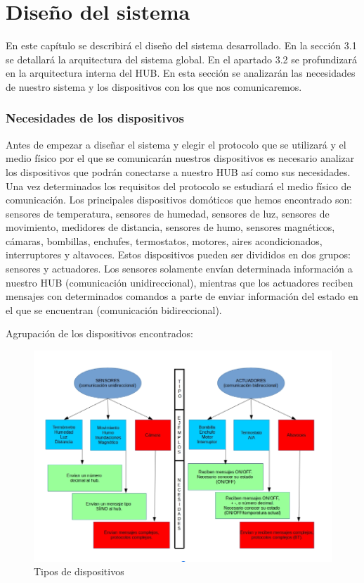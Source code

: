 \chapter{Diseño del sistema}
\label{chap:disenosistema}
En este capítulo se describirá el diseño del sistema desarrollado. 
En la sección 3.1 se detallará la arquitectura del sistema global. 
En el apartado 3.2 se profundizará en la arquitectura interna del HUB.
En esta sección se analizarán las necesidades de nuestro sistema y los dispositivos con los que nos comunicaremos.
\subsection{Necesidades de los dispositivos}
Antes de empezar a diseñar el sistema y elegir el protocolo que se utilizará y el medio físico por el que se comunicarán 
nuestros dispositivos es necesario analizar los dispositivos que podrán conectarse a nuestro HUB así como sus necesidades. 
Una vez determinados los requisitos del protocolo se estudiará el medio físico de comunicación.
\newline
\newline
Los principales dispositivos domóticos que hemos encontrado son: sensores de temperatura, sensores de humedad, 
sensores de luz, sensores de movimiento, medidores de distancia, sensores de humo, sensores magnéticos, cámaras, 
bombillas, enchufes, termostatos, motores, aires acondicionados, interruptores y altavoces.
\newline
Estos dispositivos pueden ser divididos en dos grupos: sensores y actuadores. 
\newline
Los sensores solamente envían determinada información a nuestro HUB (comunicación unidireccional), 
mientras que los actuadores reciben mensajes con determinados comandos a parte de enviar información del estado 
en el que se encuentran (comunicación bidireccional).

Agrupación de los dispositivos encontrados:

\begin{figure}[H]
\centering
\includegraphics[width=6.00in]{images/descripcion_dispositivos.png}
\caption{Tipos de dispositivos}
\label{fig:descripcion_dispositivos}
\end{figure}


